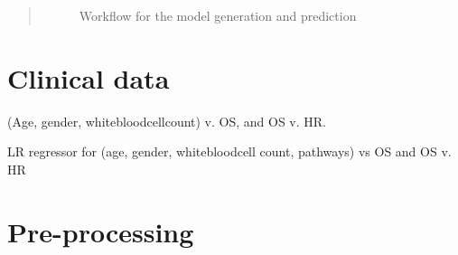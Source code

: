 \documentclass[a4paper,10pt]{article}
\begin{document}
\begin{abstract}
\begin{figure}[htp]
\caption{Workflow for the model generation and prediction}
\label{fig:workflow}
\end{figure}
%
%
\end{abstract}
%
\section{Clinical data}
%
(Age, gender, whitebloodcellcount) v. OS, and OS v. HR. 

LR regressor for (age, gender, whitebloodcell count, pathways) vs OS and OS v. HR


\section{Pre-processing}
\end{document}
